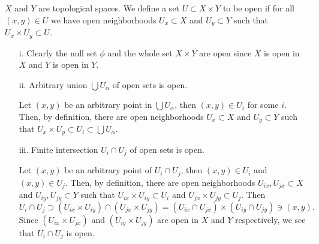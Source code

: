 \begin{solution}
    $X$ and $Y$ are topological spaces.
  We define a set $U\subset X\times Y$ to be open if
  for all $(x,y)\in U$ we have open neighborhoods $U_x
  \subset X$ and $U_y\subset Y$ such that
  $U_x\times U_y\subset U$.

  \setlength{\parskip}{3mm}
  \begin{enumerate}
    \item[i.] Clearly the null set $\phi$ and the whole set
      $X\times Y$ are open since $X$ is open in $X$ and
      $Y$ is open in $Y$.

    \item[ii.] Arbitrary union $\bigcup
    {U_\alpha}$ of open sets is open.
    
    \setlength{\parskip}{2mm}
    Let $(x,y)$ be an
    arbitrary point in $\bigcup{U_\alpha}$, then
    $(x,y)\in U_i$ for some $i$. Then, by definition,
    there are open neighborhoods $U_x
    \subset X$ and $U_y\subset Y$ such that
    $U_x\times U_y\subset U_i \subset \bigcup{U_\alpha}$.

    \item[iii.] Finite intersection $U_i\cap U_j$ of
      open sets is open.
      
      \setlength{\parskip}{2mm}
      Let $(x,y)$ be an arbitrary
      point of $U_i\cap U_j$, then $(x,y)\in U_i$ and
      $(x,y)\in U_j$. Then, by definition,
      there are open neighborhoods $U_{ix}, U_{jx}
      \subset X$ and $U_{iy}, U_{jy}\subset Y$ such that
      $U_{ix}\times U_{iy}\subset U_i$ and
      $U_{jx}\times U_{jy}\subset U_j$. Then
      $$U_i\cap U_j
      \supset \left(U_{ix}\times U_{iy}\right)
      \cap\left(U_{jx}\times U_{jy}\right)
      =\left(U_{ix}\cap U_{jx}\right)
      \times\left(U_{iy}\cap U_{jy}\right)
      \ni (x,y).$$
      Since $\left(U_{ix}\times U_{jx}\right)$
      and $\left(U_{iy}\times U_{jy}\right)$ are open
      in $X$ and $Y$ respectively, we see that
      $U_i \cap U_j$ is open.

  \end{enumerate}
\end{solution}